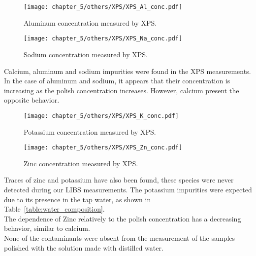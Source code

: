 \begin{figure}[H]
   \centering
   \texttt{[image: chapter\_5/others/XPS/XPS\_Al\_conc.pdf]} 
   \vspace*{-30pt}
   \caption{Aluminum concentration measured by XPS. }
   \label{fig:al_xps}
\end{figure}

\begin{figure}[H]
   \centering
   \texttt{[image: chapter\_5/others/XPS/XPS\_Na\_conc.pdf]} 
   \vspace*{-30pt}
   \caption{Sodium concentration measured by XPS. }
   \label{fig:na_xps}
\end{figure}


Calcium, aluminum and sodium impurities were found in the XPS measurements. In the case of aluminum and sodium, it appears that their concentration is increasing as the polish concentration increases. However, calcium present the opposite behavior.

\begin{figure}[H]
   \centering
   \texttt{[image: chapter\_5/others/XPS/XPS\_K\_conc.pdf]} 
   \vspace*{-30pt}
   \caption{Potassium concentration measured by XPS. }
   \label{fig:k_xps}
\end{figure}
\begin{figure}[H]
   \centering
   \texttt{[image: chapter\_5/others/XPS/XPS\_Zn\_conc.pdf]} 
   \vspace*{-30pt}
   \caption{Zinc concentration measured by XPS. }
   \label{fig:zn_xps}
\end{figure}

Traces of zinc and potassium have also been found, these species were never detected during our LIBS measurements. The potassium impurities were expected due to its presence in the tap water, as shown in Table~\ref{table:water_composition}.
\\
The dependence of Zinc relatively to the polish concentration has a decreasing behavior, similar to calcium.
\\
None of the contaminants were absent from the measurement of the samples polished with the solution made with distilled water.

